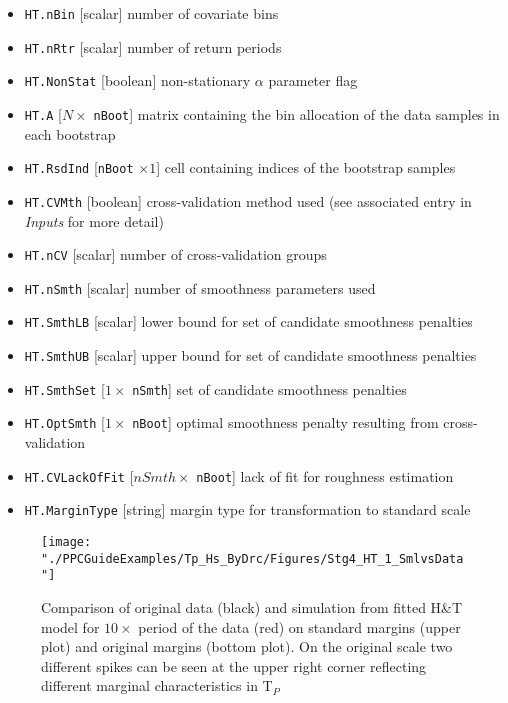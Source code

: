 \begin{itemize}
	\item \verb|HT.nBin|  [scalar] number of covariate bins
	\item \verb|HT.nRtr|  [scalar] number of return periods
	\item \verb|HT.NonStat| [boolean] non-stationary $\alpha$ parameter flag
	\item \verb|HT.A| [$N \times$ \verb|nBoot|] matrix containing the bin allocation of the data samples in each bootstrap
	\item \verb|HT.RsdInd| [\verb|nBoot| $\times 1$] cell containing indices of the bootstrap samples
	\item \verb|HT.CVMth| [boolean] cross-validation method used (see associated entry in \emph{Inputs} for more detail)
	\item \verb|HT.nCV| [scalar] number of cross-validation groups
	\item \verb|HT.nSmth| [scalar] number of smoothness parameters used
	\item \verb|HT.SmthLB| [scalar] lower bound for set of candidate smoothness penalties
	\item \verb|HT.SmthUB| [scalar] upper bound for set of candidate smoothness penalties
	\item \verb|HT.SmthSet| [$1\times$ \verb|nSmth|] set of candidate smoothness penalties
	\item \verb|HT.OptSmth| [$1 \times$ \verb|nBoot|] optimal smoothness penalty resulting from cross-validation
	\item \verb|HT.CVLackOfFit| [$nSmth\times$ \verb|nBoot|] lack of fit for roughness estimation
	\item \verb|HT.MarginType| [string] margin type for transformation to standard scale
\end{itemize}

\vspace{10pt}
	\noindent{}
\vspace{10pt}

\begin{figure}
	\centering
	\texttt{[image: "./PPCGuideExamples/Tp\_Hs\_ByDrc/Figures/Stg4\_HT\_1\_SmlvsData"]}
	\caption{Comparison of original data (black) and simulation from fitted H\&T model for $10\times$ period of the data (red) on standard margins (upper plot) and original margins (bottom plot). On the original scale two different spikes can be seen at the upper right corner reflecting different marginal characteristics in T$_P$ }
	\label{fig:Stg4_HT_1_SmlvsData}
\end{figure}


